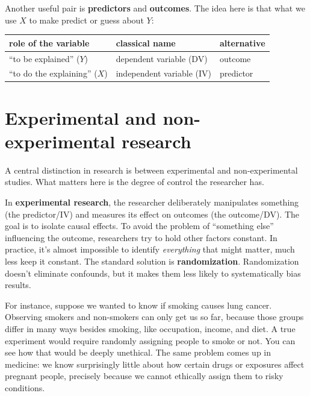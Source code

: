 \documentclass[
  letterpaper,
  DIV=11,
  numbers=noendperiod]{scrreprt}
\begin{document}
Another useful pair is \textbf{predictors} and \textbf{outcomes}. The
idea here is that what we use \(X\) to make predict or guess about
\(Y\):

\begin{longtable}[]{@{}
  >{\raggedright\arraybackslash}p{}
  >{\raggedright\arraybackslash}p{}
  >{\raggedright\arraybackslash}p{}@{}}
\toprule\noalign{}
\begin{minipage}[b]{\linewidth}\raggedright
role of the variable
\end{minipage} & \begin{minipage}[b]{\linewidth}\raggedright
classical name
\end{minipage} & \begin{minipage}[b]{\linewidth}\raggedright
alternative
\end{minipage} \\
\midrule\noalign{}
\endhead
\bottomrule\noalign{}
\endlastfoot
``to be explained'' (\(Y\)) & dependent variable (DV) & outcome \\
``to do the explaining'' (\(X\)) & independent variable (IV) &
predictor \\
\end{longtable}

\section{Experimental and non-experimental
research}\label{experimental-and-non-experimental-research}

A central distinction in research is between experimental and
non-experimental studies. What matters here is the degree of control the
researcher has.

In \textbf{experimental research}, the researcher deliberately
manipulates something (the predictor/IV) and measures its effect on
outcomes (the outcome/DV). The goal is to isolate causal effects. To
avoid the problem of ``something else'' influencing the outcome,
researchers try to hold other factors constant. In practice, it's almost
impossible to identify \emph{everything} that might matter, much less
keep it constant. The standard solution is \textbf{randomization}.
Randomization doesn't eliminate confounds, but it makes them less likely
to systematically bias results.

For instance, suppose we wanted to know if smoking causes lung cancer.
Observing smokers and non-smokers can only get us so far, because those
groups differ in many ways besides smoking, like occupation, income, and
diet. A true experiment would require randomly assigning people to smoke
or not. You can see how that would be deeply unethical. The same problem
comes up in medicine: we know surprisingly little about how certain
drugs or exposures affect pregnant people, precisely because we cannot
ethically assign them to risky conditions.
\end{document}
